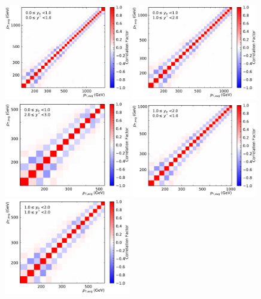 \begin{figure}[htbp]
    \centering
    \includegraphics[width=0.49\textwidth]{figures/measurement/unf_nlo_corr_yb0ys0.pdf}\hfill
    \includegraphics[width=0.49\textwidth]{figures/measurement/unf_nlo_corr_yb0ys1.pdf}
    \includegraphics[width=0.49\textwidth]{figures/measurement/unf_nlo_corr_yb0ys2.pdf}\hfill
    \includegraphics[width=0.49\textwidth]{figures/measurement/unf_nlo_corr_yb1ys0.pdf}
    \includegraphics[width=0.49\textwidth]{figures/measurement/unf_nlo_corr_yb1ys1.pdf}\hfill

\end{figure}
